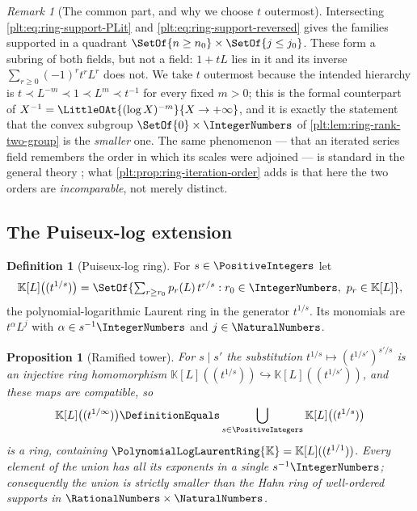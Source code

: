 \documentclass[11pt,oneside]{article}
\theoremstyle{plain}
\newtheorem{proposition}[theorem]{Proposition}
\theoremstyle{definition}
\newtheorem{definition}[theorem]{Definition}
\theoremstyle{remark}
\newtheorem{remark}[theorem]{Remark}
\newcommand{\K}{\mathbb{K}}
\newcommand{\PLlau}{\PolynomialLogLaurentRing{\K}}       %
\newcommand{\precdom}{\prec}
\begin{document}
\begin{remark}[The common part, and why we choose \(t\) outermost]
\label{plt:rmk:ring-common-part}
Intersecting \eqref{plt:eq:ring-support-PLit} and
\eqref{plt:eq:ring-support-reversed} gives the families supported in a
quadrant \(\SetOf{n\ge n_0}\times\SetOf{j\le j_0}\).  These form a subring of
both fields, but not a field: \(1+tL\) lies in it and its inverse
\(\sum_{r\ge0}(-1)^rt^rL^r\) does not.  We take \(t\) outermost because the
intended hierarchy is \(t\precdom L^{-m}\precdom1\precdom L^m\precdom t^{-1}\)
for every fixed \(m>0\); this is the formal counterpart of
\(X^{-1}=\LittleOAt{(\log X)^{-m}}{X\to+\infty}\), and it is exactly the
statement that the convex subgroup \(\SetOf{0}\times\IntegerNumbers\) of
\cref{plt:lem:ring-rank-two-group} is the \emph{smaller} one.  The same
phenomenon --- that an iterated series field remembers the order in which its
scales were adjoined --- is standard in the general theory
\cite{edgar-composition,vanderhoeven-book}; what
\cref{plt:prop:ring-iteration-order} adds is that here the two orders are
\emph{incomparable}, not merely distinct.
\end{remark}

\subsection{The Puiseux-log extension}
\label{plt:sec:ring-puiseux}

\begin{definition}[Puiseux-log ring]
\label{plt:def:ring-puiseux}
For \(s\in\PositiveIntegers\) let
\begin{equation}\label{plt:eq:ring-puiseux}
  \K[L]\bigl((t^{1/s})\bigr)
  =\SetOf{\textstyle\sum_{r\ge r_0}p_{r}(L)\,t^{r/s}:
    r_0\in\IntegerNumbers,\ p_r\in\K[L]},
\end{equation}
the polynomial-logarithmic Laurent ring in the generator \(t^{1/s}\).  Its
monomials are \(t^{\alpha}L^j\) with \(\alpha\in s^{-1}\IntegerNumbers\) and
\(j\in\NaturalNumbers\).
\end{definition}

\begin{proposition}[Ramified tower]
\label{plt:prop:ring-puiseux-tower}
For \(s\mid s'\) the substitution \(t^{1/s}\mapsto(t^{1/s'})^{s'/s}\) is an
injective ring homomorphism
\(\K[L]((t^{1/s}))\hookrightarrow\K[L]((t^{1/s'}))\), and these maps are
compatible, so
\[
  \K[L]\bigl((t^{1/\infty})\bigr)
  \DefinitionEquals
  \bigcup_{s\in\PositiveIntegers}\K[L]\bigl((t^{1/s})\bigr)
\]
is a ring, containing \(\PLlau=\K[L]((t^{1/1}))\).  Every element of the union
has all its exponents in a single \(s^{-1}\IntegerNumbers\); consequently the
union is \emph{strictly} smaller than the Hahn ring of well-ordered supports
in \(\RationalNumbers\times\NaturalNumbers\).
\end{proposition}
\end{document}
